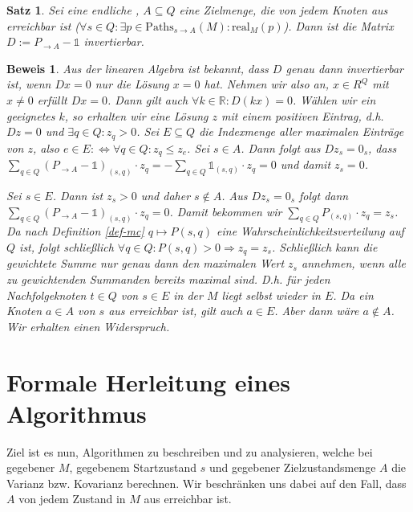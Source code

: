 \documentclass[a4paper]{article}
\newtheorem{satz}{Satz}[section] %
\theoremstyle{nonumberplain}
\newtheorem{beweis}{Beweis}
\begin{document}
\begin{satz}\label{th-unique}
	Sei \mcex{} eine endliche \mc, $A\subseteq Q$ eine Zielmenge, die von jedem Knoten aus erreichbar ist ($\forall s\in Q: \exists p \in \mathrm{Paths}_{s\rightarrow A}(M) : \mathrm{real}_M(p)$). 
	Dann ist die Matrix $D := P_{\rightarrow A} - \mathbb{1}$ invertierbar.
\end{satz}
\begin{beweis}
	Aus der linearen Algebra ist bekannt, dass $D$ genau dann invertierbar ist, wenn $Dx = 0$ nur die Lösung $x=0$ hat.
	Nehmen wir also an, $x \in R^Q$ mit $x\neq 0$ erfüllt $Dx = 0$. Dann gilt auch $\forall k \in \mathbb{R}: D (kx) = 0$. Wählen wir ein geeignetes $k$, so erhalten wir eine Lösung $z$ mit einem positiven Eintrag, d.h. $Dz = 0$ und $\exists q \in Q : z_q > 0$. Sei $E \subseteq Q$ die Indexmenge aller maximalen Einträge von $z$, also $e \in E :\Leftrightarrow \forall q \in Q : z_q \leq z_e$. Sei $s\in A$. Dann folgt aus $Dz_s = 0_s$, dass $\sum_{q\in Q}{(P_{\rightarrow A}- \mathbb{1})_{(s,q)} \cdot z_q} = -\sum_{q\in Q}{\mathbb{1}_{(s,q)} \cdot z_q} = 0$  und damit $z_s = 0$.
	
	Sei $s \in E$. Dann ist $z_s > 0$ und daher $s\notin A$. Aus $Dz_s = 0_s$ folgt dann $\sum_{q\in Q}{(P_{\rightarrow A}- \mathbb{1})_{(s,q)} \cdot z_q} = 0$. Damit bekommen wir $\sum_{q\in Q}{P_{(s,q)} \cdot z_q} = z_s$. Da nach Definition \ref{def-mc} $q \mapsto P(s,q)$ eine Wahrscheinlichkeitsverteilung auf $Q$ ist, folgt schließlich $\forall q\in Q: P(s,q) > 0 \Rightarrow z_q = z_s$. Schließlich kann die gewichtete Summe nur genau dann den maximalen Wert $z_s$ annehmen, wenn alle zu gewichtenden Summanden bereits maximal sind. D.h. für jeden Nachfolgeknoten $t\in Q$ von $s\in E$ in der \mc{} $M$ liegt selbst wieder in $E$. Da ein Knoten $a\in A$ von $s$ aus erreichbar ist, gilt auch $a\in E$. Aber dann wäre $a\notin A$. Wir erhalten einen Widerspruch.
\end{beweis}


\section{Formale Herleitung eines Algorithmus}

Ziel ist es nun, Algorithmen zu beschreiben und zu analysieren, welche bei gegebener \mc{} $M$, gegebenem Startzustand $s$ und gegebener Zielzustandsmenge $A$ die Varianz bzw. Kovarianz berechnen. Wir beschränken uns dabei auf den Fall, dass $A$ von jedem Zustand in $M$ aus erreichbar ist.
\end{document}
